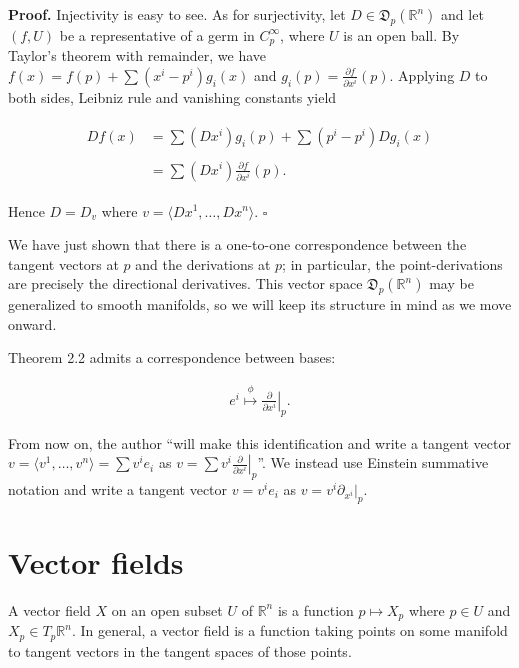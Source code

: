 \documentclass[a4paper]{article}
\newcommand{\R}{\mathbb{R}}
\begin{document}
\textbf{Proof.} Injectivity is easy to see. As for surjectivity, let $D \in \mathfrak{D}_p(\R^n)$ and let $(f, U)$ be a representative of a germ in $C_p^\infty$, where $U$ is an open ball. By Taylor's theorem with remainder, we have $f(x) = f(p) + \sum (x^i - p^i)g_i(x)$ and $g_i(p) = \frac{\partial f}{\partial x^i}(p)$. Applying $D$ to both sides, Leibniz rule and vanishing constants yield

\begin{align}
\begin{split}
    Df(x) &= \sum (Dx^i)g_i(p) + \sum (p^i - p^i) Dg_i(x) \\ \ \\
    &= \sum (Dx^i) \frac{\partial f}{\partial x^i}(p).
\end{split}
\end{align}

Hence $D = D_v$ where $v = \langle Dx^1, \ldots, Dx^n \rangle$. $\square$

We have just shown that there is a one-to-one correspondence between the tangent vectors at $p$ and the derivations at $p$; in particular, the point-derivations are precisely the directional derivatives. This vector space $\mathfrak{D}_p(\R^n)$ may be generalized to smooth manifolds, so we will keep its structure in mind as we move onward.

Theorem 2.2 admits a correspondence between bases:

\begin{align}
    e^i \overset{\phi}{\longmapsto} \left.\frac{\partial}{\partial x^i}\right|_p.
\end{align}

From now on, the author ``will make this identification and write a tangent vector $v = \langle v^1, \ldots, v^n \rangle = \sum v^ie_i$ as $v = \sum v^i \left.\frac{\partial}{\partial x^i}\right|_p$''. We instead use Einstein summative notation and write a tangent vector $v = v^ie_i$ as $v = v^i \partial_{x^i}|_p$.

\section{Vector fields}

A vector field $X$ on an open subset $U$ of $\R^n$ is a function $p \mapsto X_p$ where $p \in U$ and $X_p \in T_p\R^n$. In general, a vector field is a function taking points on some manifold to tangent vectors in the tangent spaces of those points.
\end{document}
